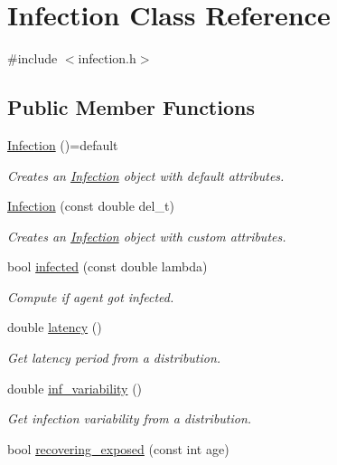 \hypertarget{classInfection}{}\section{Infection Class Reference}
\label{classInfection}


{\ttfamily \#include $<$infection.\+h$>$}

\subsection*{Public Member Functions}
\begin{DoxyCompactItemize}
\item 
\hyperlink{classInfection_a5babe90927f5311c1186e3328bef6029}{Infection} ()=default
\begin{DoxyCompactList}\small\item\em Creates an \hyperlink{classInfection}{Infection} object with default attributes. \end{DoxyCompactList}\item 
\hyperlink{classInfection_a590c592f4bfbd74549ec8ba71ab5f52c}{Infection} (const double del\+\_\+t)
\begin{DoxyCompactList}\small\item\em Creates an \hyperlink{classInfection}{Infection} object with custom attributes. \end{DoxyCompactList}\item 
bool \hyperlink{classInfection_a1fac8f0633f707e14fb10250f8ba6863}{infected} (const double lambda)
\begin{DoxyCompactList}\small\item\em Compute if agent got infected. \end{DoxyCompactList}\item 
double \hyperlink{classInfection_a12eea482720563e31b6af703c5a19e6d}{latency} ()
\begin{DoxyCompactList}\small\item\em Get latency period from a distribution. \end{DoxyCompactList}\item 
double \hyperlink{classInfection_a1fb9e4d8f90f0bece0b65f2cb2f9ef7e}{inf\+\_\+variability} ()
\begin{DoxyCompactList}\small\item\em Get infection variability from a distribution. \end{DoxyCompactList}\item 
bool \hyperlink{classInfection_a5600af48af334712c2d18cc7fadfe4a5}{recovering\+\_\+exposed} (const int age)

\end{DoxyCompactItemize}
